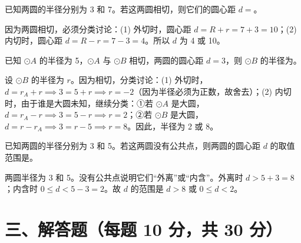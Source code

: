 \documentclass{exam-zh}
\begin{document}
\begin{question}[points=4]
  已知两圆的半径分别为 3 和 7。若这两圆相切，则它们的圆心距 $d = $\fillin。
  \paren[4 或 10]
  \begin{solutionblock}
    因为两圆相切，必须分类讨论：(1) 外切时，圆心距 $d = R+r = 7+3=10$；(2) 内切时，圆心距 $d = R-r = 7-3=4$。所以 $d$ 为 4 或 10。
  \end{solutionblock}
\end{question}



\begin{question}[points=4]
  已知 $\odot A$ 的半径为 5，$\odot A$ 与 $\odot B$ 相切，两圆的圆心距 $d = 3$，则 $\odot B$ 的半径为\fillin。
  \paren[2 或 8]
  \begin{solutionblock}
    设 $\odot B$ 的半径为 $r$。因为相切，分类讨论：(1) 外切时，$d = r_A + r \implies 3 = 5 + r \implies r = -2$（因为半径必须为正数，故舍去）；(2) 内切时，由于谁是大圆未知，继续分类：①若 $\odot A$ 是大圆，$d = r_A - r \implies 3 = 5 - r \implies r = 2$；②若 $\odot B$ 是大圆，$d = r - r_A \implies 3 = r - 5 \implies r = 8$。因此，半径为 2 或 8。
  \end{solutionblock}
\end{question}



\begin{question}[points=4]
  已知两圆的半径分别为 3 和 5。若这两圆没有公共点，则两圆的圆心距 $d$ 的取值范围是\fillin。
  \paren[$d > 8$ 或 $0 \le d < 2$]
  \begin{solutionblock}
    两圆半径为 3 和 5。没有公共点说明它们“外离”或“内含”。外离时 $d > 5+3=8$；内含时 $0 \le d < 5-3=2$。故 $d$ 的范围是 $d > 8$ 或 $0 \le d < 2$。
  \end{solutionblock}
\end{question}


\section*{三、解答题（每题 10 分，共 30 分）}

\end{document}
